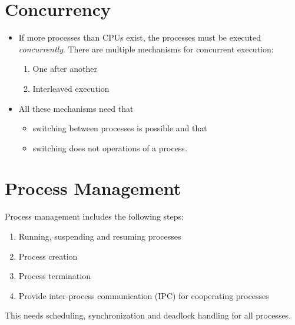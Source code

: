 \documentclass[a4paper, 11pt, accentcolor = tud3b]{tudreport}
\begin{document}
        \section{Concurrency}
            \begin{itemize}
            	\item If more processes than CPUs exist, the processes must be executed \textit{concurrently}. There are multiple mechanisms for concurrent execution:
	            	\begin{enumerate}
	            		\item One after another
	            		\item Interleaved execution
	            	\end{enumerate}
            	\item All these mechanisms need that
	            	\begin{itemize}
	            		\item switching between processes is possible and that
	            		\item switching does not operations of a process.
	            	\end{itemize}
            \end{itemize}

        \section{Process Management}
	        Process management includes the following steps:
            \begin{enumerate}
            	\item Running, suspending and resuming processes
            	\item Process creation
            	\item Process termination
            	\item Provide inter-process communication (IPC) for cooperating processes
            \end{enumerate}
	        This needs scheduling, synchronization and deadlock handling for all processes.
	        
\end{document}
